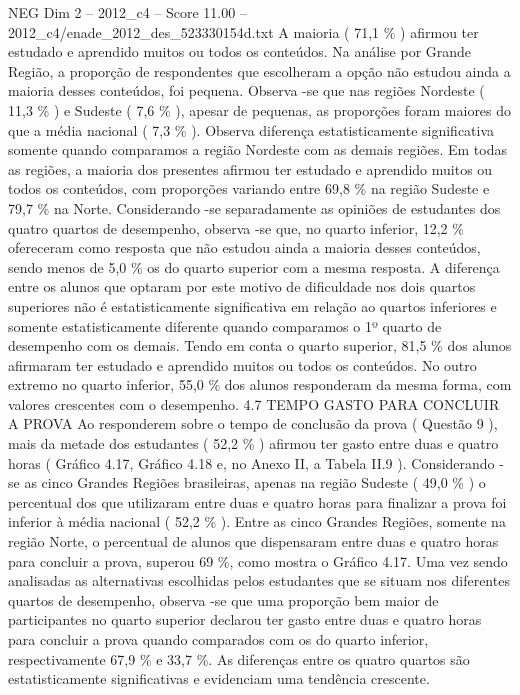 \begin{textsample}{NEG Dim 2 – 2012\_c4 – Score 11.00 – 2012\_c4/enade\_2012\_des\_523330154d.txt}
A maioria ( 71,1 \% ) afirmou ter estudado e aprendido muitos ou todos os conteúdos.
Na análise por Grande Região, a proporção de respondentes que escolheram a opção não estudou ainda a maioria desses conteúdos, foi pequena.
Observa -se que nas regiões Nordeste ( 11,3 \% ) e Sudeste ( 7,6 \% ), apesar de pequenas, as proporções foram maiores do que a média nacional ( 7,3 \% ).
Observa diferença estatisticamente significativa somente quando comparamos a região Nordeste com as demais regiões.
Em todas as regiões, a maioria dos presentes afirmou ter estudado e aprendido muitos ou todos os conteúdos, com proporções variando entre 69,8 \% na região Sudeste e 79,7 \% na Norte.
Considerando -se separadamente as opiniões de estudantes dos quatro quartos de desempenho, observa -se que, no quarto inferior, 12,2 \% ofereceram como resposta que não estudou ainda a maioria desses conteúdos, sendo menos de 5,0 \% os do quarto superior com a mesma resposta.
A diferença entre os alunos que optaram por este motivo de dificuldade nos dois quartos superiores não é estatisticamente significativa em relação ao quartos inferiores e somente estatisticamente diferente quando comparamos o 1º quarto de desempenho com os demais.
Tendo em conta o quarto superior, 81,5 \% dos alunos afirmaram ter estudado e aprendido muitos ou todos os conteúdos.
No outro extremo no quarto inferior, 55,0 \% dos alunos responderam da mesma forma, com valores crescentes com o desempenho. 4.7 TEMPO GASTO PARA CONCLUIR A PROVA Ao responderem sobre o tempo de conclusão da prova ( Questão 9 ), mais da metade dos estudantes ( 52,2 \% ) afirmou ter gasto entre duas e quatro horas ( Gráfico 4.17, Gráfico 4.18 e, no Anexo II, a Tabela II.9 ).
Considerando -se as cinco Grandes Regiões brasileiras, apenas na região Sudeste ( 49,0 \% ) o percentual dos que utilizaram entre duas e quatro horas para finalizar a prova foi inferior à média nacional ( 52,2 \% ).
Entre as cinco Grandes Regiões, somente na região Norte, o percentual de alunos que dispensaram entre duas e quatro horas para concluir a prova, superou 69 \%, como mostra o Gráfico 4.17.
Uma vez sendo analisadas as alternativas escolhidas pelos estudantes que se situam nos diferentes quartos de desempenho, observa -se que uma proporção bem maior de participantes no quarto superior declarou ter gasto entre duas e quatro horas para concluir a prova quando comparados com os do quarto inferior, respectivamente 67,9 \% e 33,7 \%.
As diferenças entre os quatro quartos são estatisticamente significativas e evidenciam uma tendência crescente.

\end{textsample}
